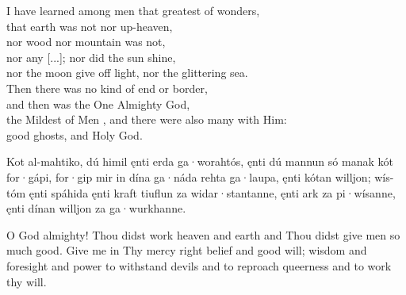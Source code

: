\bvb I have learned among men that greatest of wonders, \\
that earth was not nor up-heaven, \\
nor wood nor mountain was not, \\
nor any [...]; nor did the sun shine, \\
nor the moon give off light, nor the glittering sea. \\
Then there was no kind of end or border, \\
and then was the One Almighty God, \\
the Mildest of Men , and there were also many with Him: \\
good ghosts, and Holy God.\evb\evg


\bpg\bpa Kot al-mahtiko, dú himil ęnti erda ga·worahtós, ęnti dú mannun só manak kót for·gápi,
for·gip mir in dína ga·náda rehta ga·laupa, ęnti kótan willjon; wís-tóm ęnti spáhida ęnti kraft tiuflun za widar·stantanne, ęnti ark za pi·wísanne, ęnti dínan willjon za ga·wurkhanne.\epa

\bpb O God almighty! Thou didst work heaven and earth and Thou didst give men so much good.
Give me in Thy mercy right belief and good will; wisdom and foresight and power to withstand devils and to reproach queerness and to work thy will.\epb\epg

\sectionline
